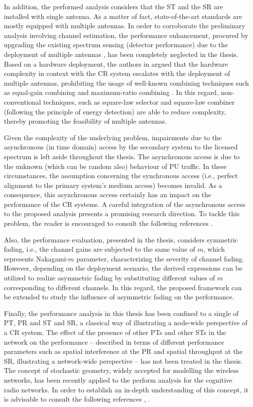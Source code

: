 In addition, the performed analysis considers that the ST and the SR are installed with single antenna. As a matter of fact, state-of-the-art standards are mostly equipped with multiple antennas. In order to corroborate the preliminary analysis involving channel estimation, the performance enhancement, procured by upgrading the existing spectrum sensing (detector performance) due to the deployment of multiple antennas \cite{Dig07,Tah10}, has been completely neglected in the thesis. Based on a hardware deployment, the authors in  argued that the hardware complexity in context with the CR system escalates with the deployment of multiple antennas, prohibiting the usage of well-known combining techniques such as equal-gain combining and maximum-ratio combining \cite{Alouini03}. In this regard, non-conventional techniques, such as square-law selector and square-law combiner (following the principle of energy detection) are able to reduce complexity, thereby promoting the feasibility of multiple antennas. 

Given the complexity of the underlying problem, impairments due to the asynchronous (in time domain) access by the secondary system to the licensed spectrum is left aside throughout the thesis. The asynchronous access is due to the unknown (which can be random also) behaviour of PU traffic. In these circumstances, the assumption concerning the synchronous access (i.e., perfect alignment to the primary system's medium access) becomes invalid. As a consequence, this asynchronous access certainly has an impact on the performance of the CR systems. A careful integration of the asynchronous access to the proposed analysis presents a promising research direction. To tackle this problem, the reader is encouraged to consult the following references \cite{Jiang13_, Jiang15}.

Also, the performance evaluation, presented in the thesis, considers symmetric fading, i.e., the channel gains are subjected to the same value of $m$, which represents Nakagami-$m$ parameter, characterizing the severity of channel fading. However, depending on the deployment scenario, the derived expressions can be utilized to realize asymmetric fading \cite{Sura08} by substituting different values of $m$ corresponding to different channels. In this regard, the proposed framework can be extended to study the influence of asymmetric fading on the performance. 

Finally, the performance analysis in this thesis has been confined to a single of PT, PR and ST and SR, a classical way of illustrating a node-wide perspective of a CR system. The effect of the presence of other PTs and other STs in the network on the performance -- described in terms of different performance parameters such as spatial interference at the PR and spatial throughput at the SR, illustrating a network-wide perspective -- has not been treated in the thesis. The concept of stochastic geometry, widely accepted for modelling the wireless networks, has been recently applied to the perform analysis for the cognitive radio networks. In order to establish an in-depth understanding of this concept, it is advisable to consult the following references \cite{Ghasemi08, Lee12, Kusal12, Kusal13, Elsawy13, Song14}, . 

